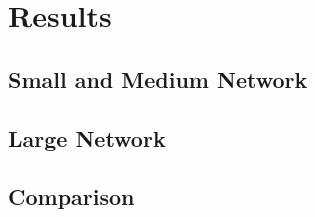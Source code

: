 
\chapter{Results}

\section{Small and Medium Network}

\section{Large Network}

\section{Comparison}
